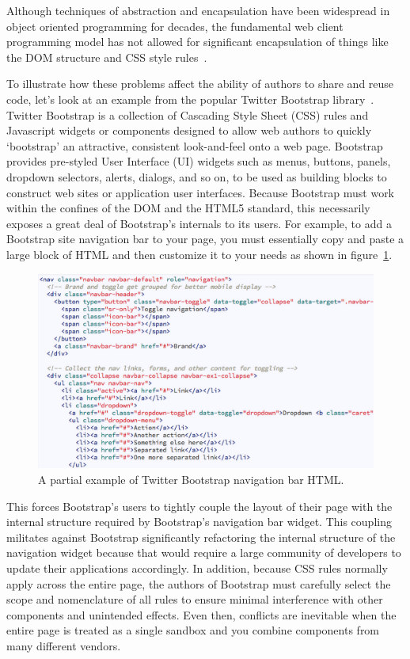Although techniques of abstraction and encapsulation have been widespread in object oriented programming for decades,
the fundamental web client programming model has not allowed for significant encapsulation of things like the DOM structure and CSS style rules~\cite{ihrig2012}.

To illustrate how these problems affect the ability of authors to share and reuse code, let's look at an example from the popular Twitter Bootstrap library~\cite{bootstrapcontributors2015}.
Twitter Bootstrap is a collection of Cascading Style Sheet (CSS) rules and Javascript widgets or components designed to allow web authors to quickly `bootstrap' an attractive, consistent look-and-feel onto a web page.
Bootstrap provides pre-styled User Interface (UI) widgets such as menus, buttons, panels, dropdown selectors, alerts, dialogs, and so on, to be used as building blocks to construct web sites or application user interfaces.
Because Bootstrap must work within the confines of the DOM and the HTML5 standard, this necessarily exposes a great deal of Bootstrap's internals to its users.
For example, to add a Bootstrap site navigation bar to your page, you must essentially copy and paste a large block of HTML and then customize it to your needs as shown in figure~\ref{f:twbs1}.

% 
\begin{figure}[htb]
\centering
 \includegraphics[width=6in]{images/bootstrap_navbar_html.png}
\caption{A partial example of Twitter Bootstrap navigation bar HTML.}
\label{f:twbs1}
\end{figure}
%

This forces Bootstrap's users to tightly couple the layout of their page with the internal structure required by Bootstrap's navigation bar widget. 
This coupling militates against Bootstrap significantly refactoring the internal structure of the navigation widget because that would require a large community of developers to update their applications accordingly.
In addition, because CSS rules normally apply across the entire page, the authors of Bootstrap must carefully select the scope and nomenclature of all rules to ensure minimal interference with other components and unintended effects. 
Even then, conflicts are inevitable when the entire page is treated as a single sandbox and you combine components from many different vendors. 

